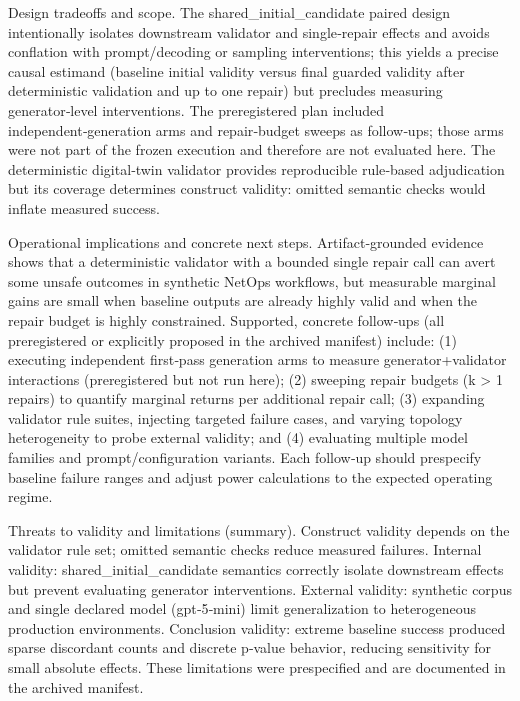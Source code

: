 \documentclass[conference]{IEEEtran}
\begin{document}
Design tradeoffs and scope. The shared\_initial\_candidate paired design intentionally isolates downstream validator and single‑repair effects and avoids conflation with prompt/decoding or sampling interventions; this yields a precise causal estimand (baseline initial validity versus final guarded validity after deterministic validation and up to one repair) but precludes measuring generator‑level interventions. The preregistered plan included independent‑generation arms and repair‑budget sweeps as follow‑ups; those arms were not part of the frozen execution and therefore are not evaluated here. The deterministic digital‑twin validator provides reproducible rule‑based adjudication but its coverage determines construct validity: omitted semantic checks would inflate measured success.

Operational implications and concrete next steps. Artifact‑grounded evidence shows that a deterministic validator with a bounded single repair call can avert some unsafe outcomes in synthetic NetOps workflows, but measurable marginal gains are small when baseline outputs are already highly valid and when the repair budget is highly constrained. Supported, concrete follow‑ups (all preregistered or explicitly proposed in the archived manifest) include: (1) executing independent first‑pass generation arms to measure generator+validator interactions (preregistered but not run here); (2) sweeping repair budgets (k > 1 repairs) to quantify marginal returns per additional repair call; (3) expanding validator rule suites, injecting targeted failure cases, and varying topology heterogeneity to probe external validity; and (4) evaluating multiple model families and prompt/configuration variants. Each follow‑up should prespecify baseline failure ranges and adjust power calculations to the expected operating regime.

Threats to validity and limitations (summary). Construct validity depends on the validator rule set; omitted semantic checks reduce measured failures. Internal validity: shared\_initial\_candidate semantics correctly isolate downstream effects but prevent evaluating generator interventions. External validity: synthetic corpus and single declared model (gpt‑5‑mini) limit generalization to heterogeneous production environments. Conclusion validity: extreme baseline success produced sparse discordant counts and discrete p‑value behavior, reducing sensitivity for small absolute effects. These limitations were prespecified and are documented in the archived manifest.
\end{document}
